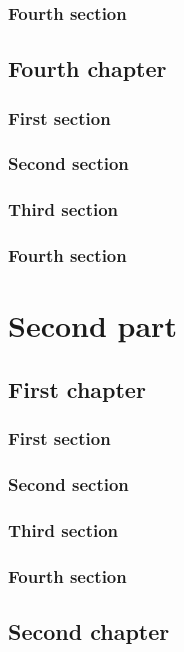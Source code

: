 \documentclass{researchbook}
\begin{document}
\section{Fourth section}\lipsum


\chapter{Fourth chapter}

\section{First section}\lipsum
\section{Second section}\lipsum
\section{Third section}\lipsum
\section{Fourth section}\lipsum


\part{Second part}
\chapter{First chapter}

\section{First section}\lipsum
\section{Second section}\lipsum
\section{Third section}\lipsum
\section{Fourth section}\lipsum


\chapter{Second chapter}
\end{document}
